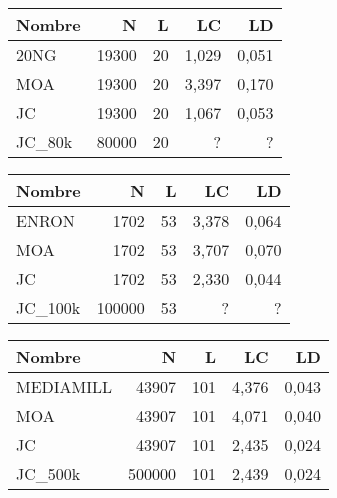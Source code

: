 
\begin{tabular}{lrrrr}
	\toprule
	Nombre  & N     & L  & LC    & LD    \\
	\midrule
	20NG    & 19300 & 20 & 1,029 & 0,051 \\
	MOA     & 19300 & 20 & 3,397 & 0,170 \\
	JC      & 19300 & 20 & 1,067 & 0,053 \\
	JC\_80k & 80000 & 20 & ?     & ?     \\
	\bottomrule
\end{tabular}
\begin{tabular}{lrrrr}
	\toprule
	Nombre   & N      & L  & LC    & LD    \\
	\midrule
	ENRON    & 1702   & 53 & 3,378 & 0,064 \\
	MOA      & 1702   & 53 & 3,707 & 0,070 \\
	JC       & 1702   & 53 & 2,330 & 0,044 \\
	JC\_100k & 100000 & 53 & ?     & ?     \\
	\bottomrule
\end{tabular}
\begin{tabular}{lrrrr}
	\toprule
	Nombre    & N      & L   & LC    & LD    \\
	\midrule
	MEDIAMILL & 43907  & 101 & 4,376 & 0,043 \\
	MOA       & 43907  & 101 & 4,071 & 0,040 \\
	JC        & 43907  & 101 & 2,435 & 0,024 \\
	JC\_500k  & 500000 & 101 & 2,439 & 0,024 \\
	\bottomrule
\end{tabular}
